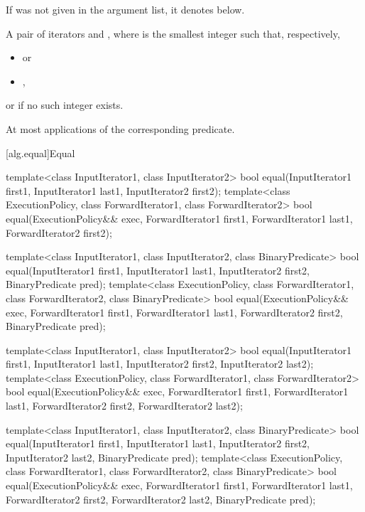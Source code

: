 \begin{itemdescr}
\pnum
\remarks If  was not given in the argument list, it denotes
 below.

\pnum
\returns
A pair of iterators  and
, where  is the smallest integer
such that, respectively,
\begin{itemize}
\item {} or
\item {},
\end{itemize}
or  if no such integer exists.

\pnum
\complexity
At most
applications of the corresponding predicate.
\end{itemdescr}

[alg.equal]{Equal}

%
\begin{itemdecl}
template<class InputIterator1, class InputIterator2>
  bool equal(InputIterator1 first1, InputIterator1 last1,
             InputIterator2 first2);
template<class ExecutionPolicy, class ForwardIterator1, class ForwardIterator2>
  bool equal(ExecutionPolicy&& exec,
             ForwardIterator1 first1, ForwardIterator1 last1,
             ForwardIterator2 first2);

template<class InputIterator1, class InputIterator2,
          class BinaryPredicate>
  bool equal(InputIterator1 first1, InputIterator1 last1,
             InputIterator2 first2, BinaryPredicate pred);
template<class ExecutionPolicy, class ForwardIterator1, class ForwardIterator2,
         class BinaryPredicate>
  bool equal(ExecutionPolicy&& exec,
             ForwardIterator1 first1, ForwardIterator1 last1,
             ForwardIterator2 first2, BinaryPredicate pred);

template<class InputIterator1, class InputIterator2>
  bool equal(InputIterator1 first1, InputIterator1 last1,
             InputIterator2 first2, InputIterator2 last2);
template<class ExecutionPolicy, class ForwardIterator1, class ForwardIterator2>
  bool equal(ExecutionPolicy&& exec,
             ForwardIterator1 first1, ForwardIterator1 last1,
             ForwardIterator2 first2, ForwardIterator2 last2);

template<class InputIterator1, class InputIterator2,
           class BinaryPredicate>
  bool equal(InputIterator1 first1, InputIterator1 last1,
             InputIterator2 first2, InputIterator2 last2,
             BinaryPredicate pred);
template<class ExecutionPolicy, class ForwardIterator1, class ForwardIterator2,
         class BinaryPredicate>
  bool equal(ExecutionPolicy&& exec,
             ForwardIterator1 first1, ForwardIterator1 last1,
             ForwardIterator2 first2, ForwardIterator2 last2,
             BinaryPredicate pred);
\end{itemdecl}

